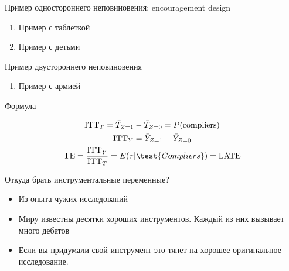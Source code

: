 \begin{frame}{Пример одностороннего неповиновения: encouragement design}

\begin{enumerate}
    \item Пример с таблеткой
    \item Пример с детьми
\end{enumerate}

\end{frame}

\begin{frame}{Пример двустороннего неповиновения}

\begin{enumerate}
    \item Пример с армией
\end{enumerate}

\end{frame}

\begin{frame}{Формула}

\begin{gather}
    \text{ITT}_T = \bar T_{Z=1} - \bar T_{Z=0} = P(\text{compliers}) \\
    \text{ITT}_Y = \bar Y_{Z=1} - \bar Y_{Z=0} \\ %
    \text{TE} = \frac{\text{ITT}_Y}{\text{ITT}_T} = E(\tau|\test{Compliers}) = \text{LATE}
\end{gather}
\end{frame}

\begin{frame}{Откуда брать инструментальные переменные?}
\begin{itemize}
    \item Из опыта чужих исследований
    \item Миру известны десятки хороших инструментов. Каждый из них вызывает много дебатов
    \item Если вы придумали свой инструмент это тянет на хорошее оригинальное исследование.
\end{itemize}

\end{frame}



    





